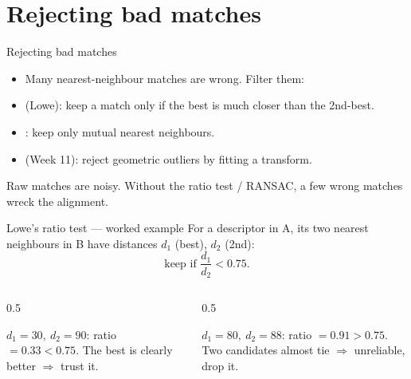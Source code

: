 \documentclass[10pt,aspectratio=169]{beamer}
\begin{document}
\section{Rejecting bad matches}

\begin{frame}{Rejecting bad matches}
  \begin{itemize}
    \item Many nearest-neighbour matches are wrong. Filter them:
    \item {} (Lowe): keep a match only if the best is much closer than the 2nd-best.
    \item {}: keep only mutual nearest neighbours.
    \item {} (Week 11): reject geometric outliers by fitting a transform.
  \end{itemize}
  \begin{badbox}
    Raw matches are noisy. Without the ratio test / RANSAC, a few wrong matches wreck the alignment.
  \end{badbox}
\end{frame}

\begin{frame}{Lowe's ratio test — worked example}
  For a descriptor in A, its two nearest neighbours in B have distances $d_1$ (best), $d_2$ (2nd):
  \[ \text{keep if } \frac{d_1}{d_2} < 0.75 . \]
  \begin{columns}[T]
    \begin{column}{0.5\textwidth}
      \begin{goodbox}
        $d_1=30,\ d_2=90$: ratio $=0.33<0.75$. The best is clearly better $\Rightarrow$ trust it.
      \end{goodbox}
    \end{column}
    \begin{column}{0.5\textwidth}
      \begin{badbox}
        $d_1=80,\ d_2=88$: ratio $=0.91>0.75$. Two candidates almost tie $\Rightarrow$ unreliable, drop it.
      \end{badbox}
    \end{column}
  \end{columns}
\end{frame}
\end{document}

